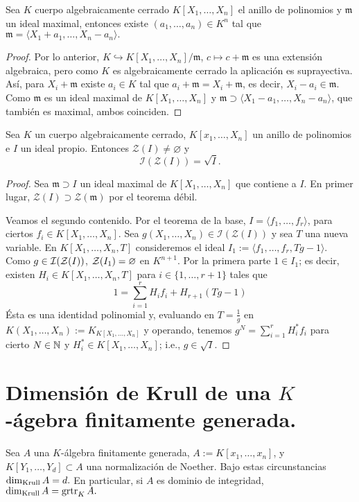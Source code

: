 \documentclass[../main.tex]{subfiles}
\begin{document}
\begin{theorem}
	Sea $K$ cuerpo algebraicamente cerrado $K[X_1,\dots,X_n]$ el anillo de polinomios y $\mathfrak{m}$ un ideal maximal, entonces existe $(a_1,\dots,a_n)\in K^n$ tal que $\mathfrak{m}=\langle X_1+a_1,\dots,X_n-a_n\rangle.$
\end{theorem}

\begin{proof}
	Por lo anterior, $K\hookrightarrow K[X_1,\dots,X_n]/\mathfrak{m}$, $c\mapsto c+\mathfrak{m}$ es una extensión algebraica, pero como $K$ es algebraicamente cerrado la aplicación es suprayectiva. Así, para $X_i+\mathfrak{m}$ existe $a_i\in K$ tal que $a_i+\mathfrak{m}=X_i+\mathfrak{m}$, es decir, $X_i-a_i\in\mathfrak{m}.$ Como $\mathfrak{m}$ es un ideal maximal de $K[X_1,\dots, X_n]$ y $\mathfrak{m}\supset\langle X_1-a_1,\dots, X_n-a_n\rangle$, que también es maximal, ambos coinciden.
\end{proof}

\begin{theorem}
	Sea $K$ un cuerpo algebraicamente cerrado, $K[x_1,\dots,X_n]$ un anillo de polinomios e $I$ un ideal propio. Entonces $\mathcal{Z}(I)\neq\varnothing$ y
	$$\mathcal{I}(\mathcal{Z}(I))=\sqrt{I}.$$
\end{theorem}

\begin{proof}
	Sea $\mathfrak{m}\supset I$ un ideal maximal de $K[X_1,\dots,X_n]$ que contiene a $I.$ En primer lugar, $\mathcal{Z}(I)\supset\mathcal{Z}(\mathfrak{m})$ por el teorema débil.
	
	Veamos el segundo contenido. Por el teorema de la base, $I=\langle f_1,\dots,f_r\rangle$, para ciertos $f_i\in K[X_1,\dots,X_n].$ Sea $g(X_1,\dots,X_n)\in\mathcal{I}(\mathcal{Z}(I))$ y sea $T$ una nueva variable. En $K[X_1,\dots,X_n,T]$ consideremos el ideal $I_1:=\langle f_1,\dots,f_r,Tg-1\rangle.$ Como $g\in\mathcal{I}(\mathcal{Z}(I))$, $\mathcal{Z}(I_1)=\varnothing$ en $K^{n+1}.$ Por la primera parte $1\in I_1$; es decir, existen $H_i\in K[X_1,\dots,X_n,T]$ para $i\in\{1,\dots,r+1\}$ tales que
	$$1=\sum_{i=1}^rH_i f_i+H_{r+1}(Tg-1)$$
	Ésta es una identidad polinomial y, evaluando en $T=\frac{1}{g}$ en $K(X_1,\dots,X_n):=K_{K[X_1,\dots,X_n]}$ y operando, tenemos $g^N=\sum_{i=1}^rH_i^*f_i$ para cierto $N\in \mathbb{N}$ y $H_i^*\in K[X_1,\dots,X_n]$; i.e., $g\in\sqrt I.$
\end{proof}

\section{Dimensión de Krull de una $K$-ágebra finitamente generada.}
\begin{theorem}
	Sea $A$ una $K$-álgebra finitamente generada, $A:=K[x_1,\dots,x_n]$, y $K[Y_1,\dots,Y_d]\subset A$ una normalización de Noether. Bajo estas circunstancias $\dim_{\text{Krull}} A=d.$ En particular, si $A$ es dominio de integridad, $\dim_{\text{Krull}} A=\operatorname{grtr}_K A.$
\end{theorem}
\end{document}
